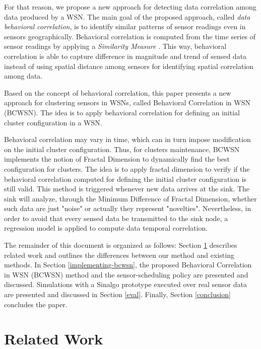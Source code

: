 \documentclass{acm_proc_article-sp}
\begin{document}
For that reason, we propose a new approach for detecting data correlation among data produced by a WSN. The main goal of the proposed approach, called  {\it data behavioral correlation}, is to identify similar patterns of sensor readings even in sensors geographically. Behavioral correlation is computed from the time series of sensor readings by applying a {\it Similarity Measure} \cite{Liu2007}. This way, behavioral correlation is able to capture difference in magnitude and
trend of sensed data instead of using spatial distance among
sensors for identifying spatial correlation among data.

Based on the concept of behavioral correlation, this paper presents a new approach for clustering sensors in WSNs, called Behavioral Correlation in WSN (BCWSN). The idea is to apply behavioral correlation for defining an initial cluster configuration in a WSN. 

Behavioral correlation may vary in time, which can in turn impose modification on the initial cluster configuration. Thus, for clusters maintenance, BCWSN implements the notion of Fractal Dimension to dynamically find the best configuration for
clusters. The idea is to apply fractal dimension to verify if the behavioral correlation computed for defining the initial cluster configuration is still valid. This method is triggered whenever new data arrives at the sink.
The sink will analyze, through the Minimum Difference of Fractal Dimension,
whether such data are just "noise" or actually they represent "novelties".  Nevertheless, in order to avoid that every sensed data be transmitted to the sink node, a regression model is applied to compute data temporal correlation. 
\vspace*{-.3cm}

The remainder of this document is organized as follows: Section
\ref{related-work} describes related work and outlines the differences between
our method and existing methods. In Section \ref{implementing-bcwsn}, the
proposed Behavioral Correlation in WSN (BCWSN) method and the sensor-scheduling
policy are presented and discussed. Simulations with a Sinalgo
\cite{Sinalgo2007} prototype executed over real sensor data are presented and discussed in
Section \ref{eval}. Finally, Section \ref{conclusion} concludes the paper.


\section{Related Work}
\label{related-work}
\end{document}
